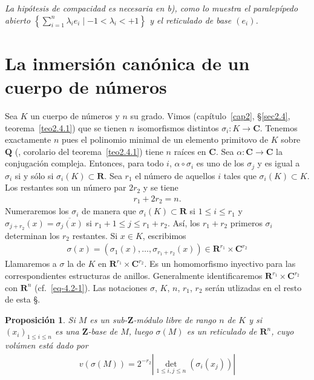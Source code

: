 \documentclass[bibtotoc,leqno,spanish]{amsbook}
\let\emph\relax %
\newcommand{\RR}{\mathbf{R}}
\newcommand{\QQ}{\mathbf{Q}}
\newcommand{\ZZ}{\mathbf{Z}}
\newcommand{\CC}{\mathbf{C}}
\newcommand{\oline}[1]{\overline{#1}}
\newcommand{\abs}[1]{\left\lvert#1\right\rvert}
\renewcommand{\to}[1][]{\xrightarrow{#1}}
\numberwithin{equation}{section}
\newenvironment{comm}%
	{\begin{list}{}{\setlength{\leftmargin}{2\parindent}\setlength{\topsep}{\baselineskip}}\item\itshape}
	{\end{list}}
\theoremstyle{note}
\theoremstyle{note}
\newtheorem{proposition}{Proposici\'on}
\theoremstyle{rem}
\numberwithin{theorem}{section}
\numberwithin{proposition}{section}
\numberwithin{definition}{section}
\numberwithin{lemma}{section}
\numberwithin{corollary}{section}
\numberwithin{example}{section}
\numberwithin{footnote}{section}%
\begin{document}
\begin{comm}
La hip\'otesis de compacidad es necesaria en b), como lo muestra el paralep\'ipedo abierto
$\left\{\sum_{i=1}^{n}\lambda_{i}e_{i}\mid-1<\lambda_{i}<+1\right\}$ y el reticulado de base $(e_{i})$.
\end{comm}

\section{La inmersi\'on can\'onica de un cuerpo de n\'umeros}\label{sec4.2}

Sea $K$ un cuerpo de n\'umeros y $n$ su grado. Vimos
(cap\'itulo~\ref{cap2}, \S\ref{sec2.4}, teorema~\ref{teo2.4.1}) que se tienen $n$
isomorfismos distintos $\sigma_{i}:K\to\CC$. Tenemos exactamente $n$ pues el polinomio minimal de
un elemento primitovo de $K$ sobre $\QQ$ (\emph{ibid.}, corolario del teorema~\ref{teo2.4.1}) tiene $n$ ra\'ices en $\CC$. Sea
$\alpha:\CC\to\CC$ la conjugaci\'on compleja. Entonces, para todo $i$, $\alpha\circ\sigma_{i}$ es uno
de los $\sigma_{j}$ y es igual a $\sigma_{i}$ si y s\'olo si $\sigma_{i}(K)\subset\RR$. Sea $r_{1}$ el n\'umero
de aquellos $i$ tales que $\sigma_{i}(K)\subset K$. Los restantes son un n\'umero par $2r_{2}$ y
se tiene
\begin{gather}\label{eq-4.2-1}
r_{1}+2r_{2}=n.
\end{gather}
Numeraremos los $\sigma_{i}$ de manera que $\sigma_{i}(K)\subset\RR$ si $1\leq i\leq r_{1}$ y
$\sigma_{j+r_{2}}(x) = \oline{\sigma_{j}(x)}$ si $r_{1}+1\leq j\leq r_{1}+r_{2}$. As\'i, los $r_{1}+r_{2}$
primeros $\sigma_{i}$ determinan los $r_{2}$ restantes. Si $x\in K$, escribimos
\begin{gather}
\sigma(x) = (\sigma_{1}(x),\dots,\sigma_{r_{1}+r_{2}}(x))\in\RR^{r_{1}}\times\CC^{r_{2}}
\end{gather}
Llamaremos a $\sigma$ la \emph{inclusi\'on can\'onica} de $K$ en $\RR^{r_{1}}\times\CC^{r_{2}}$. Es un
homomorfismo inyectivo para las correspondientes estructuras de anillos. Generalmente identificaremos
$\RR^{r_{1}}\times\CC^{r_{2}}$ con $\RR^{n}$ (cf.~\eqref{eq-4.2-1}). Las notaciones $\sigma$, $K$, $n$, $r_{1}$, $r_{2}$
ser\'an utlizadas en el resto de esta \S.

\begin{proposition}\label{prop4.2.1}
Si $M$ es un sub-$\ZZ$-m\'odulo libre de rango $n$ de $K$ y si $(x_{i})_{1\leq i\leq n}$ es una $\ZZ$-base
de $M$, luego $\sigma(M)$ es un reticulado de $\RR^{n}$, cuyo vol\'umen est\'a dado por
\begin{gather}\label{eq-4.2-3}
v(\sigma(M)) = 2^{-r_{2}}\abs{\det_{1\leq i,j\leq n}(\sigma_{i}(x_{j}))}
\end{gather}
\end{proposition}
\end{document}
